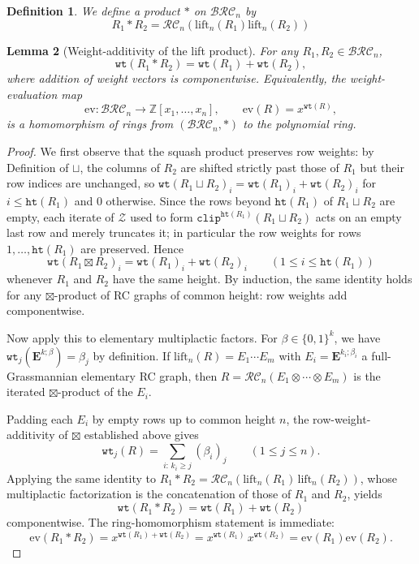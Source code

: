 \documentclass[pdflatex,sn-mathphys-num]{sn-jnl}
\numberwithin{equation}{subsection}
\newcommand{\wtt}{\mathtt{wt}}
\newcommand{\zeromap}{\mathcal{Z}}
\newcommand{\hr}{\mathtt{ht}}
\newcommand{\clp}{\mathtt{clip}}
\newcommand{\BRC}{\mathcal{BRC}}
\newcommand{\RC}{\mathcal{RC}}
\theoremstyle{thmstyleone}
\newtheorem{lemma}{Lemma}[subsection]
\theoremstyle{thmstylethree}
\newtheorem{definition}[lemma]{Definition}
\theoremstyle{thmstyletwo}
\begin{document}
\begin{definition}
We define a product $*$ on $\BRC_n$ by
$$R_1*R_2 = \RC_n(\mathrm{lift}_n(R_1)\mathrm{lift}_n(R_2))$$
\end{definition}

\begin{lemma}[Weight-additivity of the lift product]\label{lemma:liftweight}
For any $R_1, R_2\in\BRC_n$,
$$\wtt(R_1 * R_2) = \wtt(R_1) + \wtt(R_2),$$
where addition of weight vectors is componentwise. Equivalently, the weight-evaluation map
$$\mathrm{ev}:\BRC_n\to\mathbb{Z}[x_1,\ldots,x_n],\qquad \mathrm{ev}(R) = x^{\wtt(R)},$$
is a homomorphism of rings from $(\BRC_n,*)$ to the polynomial ring.
\end{lemma}
\begin{proof}
We first observe that the squash product preserves row weights: by Definition of $\sqcup$, the columns of $R_2$ are shifted strictly past those of $R_1$ but their row indices are unchanged, so $\wtt(R_1\sqcup R_2)_i = \wtt(R_1)_i + \wtt(R_2)_i$ for $i\leq \hr(R_1)$ and $0$ otherwise. Since the rows beyond $\hr(R_1)$ of $R_1\sqcup R_2$ are empty, each iterate of $\zeromap$ used to form $\clp^{\hr(R_1)}(R_1\sqcup R_2)$ acts on an empty last row and merely truncates it; in particular the row weights for rows $1,\ldots,\hr(R_1)$ are preserved. Hence
$$\wtt(R_1\boxtimes R_2)_i = \wtt(R_1)_i + \wtt(R_2)_i\qquad (1\leq i\leq \hr(R_1))$$
whenever $R_1$ and $R_2$ have the same height. By induction, the same identity holds for any $\boxtimes$-product of RC graphs of common height: row weights add componentwise.

Now apply this to elementary multiplactic factors. For $\beta\in\{0,1\}^k$, we have $\wtt_j(\mathbf{E}^{k;\beta}) = \beta_j$ by definition. If $\mathrm{lift}_n(R) = E_1\cdots E_m$ with $E_i = \mathbf{E}^{k_i;\beta_i}$ a full-Grassmannian elementary RC graph, then $R = \RC_n(E_1\otimes\cdots\otimes E_m)$ is the iterated $\boxtimes$-product of the $E_i$.

Padding each $E_i$ by empty rows up to common height $n$, the row-weight-additivity of $\boxtimes$ established above gives
$$\wtt_j(R) = \sum_{i:\,k_i\geq j} (\beta_i)_j\qquad (1\leq j\leq n).$$
Applying the same identity to $R_1*R_2 = \RC_n(\mathrm{lift}_n(R_1)\,\mathrm{lift}_n(R_2))$, whose multiplactic factorization is the concatenation of those of $R_1$ and $R_2$, yields
$$\wtt(R_1*R_2) = \wtt(R_1) + \wtt(R_2)$$
componentwise. The ring-homomorphism statement is immediate:
$$\mathrm{ev}(R_1*R_2) = x^{\wtt(R_1)+\wtt(R_2)} = x^{\wtt(R_1)}\,x^{\wtt(R_2)} = \mathrm{ev}(R_1)\mathrm{ev}(R_2).$$
\end{proof}
\end{document}
